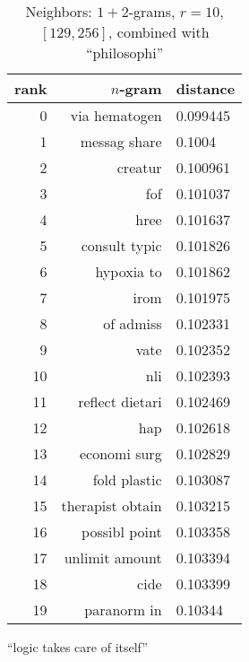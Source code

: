 \begin{table}[t]
\begin{subtable}[t]{.45\textwidth}
\begin{tabularx}{\textwidth}{r R l}
            \toprule
            rank & $n$-gram & distance\\
            \midrule
            \num{0} & via hematogen & \num{0.099445}\\
            \num{1} & messag share & \num{0.1004}\\
            \num{2} & creatur & \num{0.100961}\\
            \num{3} & fof & \num{0.101037}\\
            \num{4} & hree & \num{0.101637}\\
            \num{5} & consult typic & \num{0.101826}\\
            \midrule
            \num{6} & hypoxia to & \num{0.101862}\\
            \num{7} & irom & \num{0.101975}\\
            \num{8} & of admiss & \num{0.102331}\\
            \num{9} & vate & \num{0.102352}\\
            \num{10} & nli & \num{0.102393}\\
            \num{11} & reflect dietari & \num{0.102469}\\
            \num{12} & hap & \num{0.102618}\\
            \num{13} & economi surg & \num{0.102829}\\
            \num{14} & fold plastic & \num{0.103087}\\
            \num{15} & therapist obtain & \num{0.103215}\\
            \num{16} & possibl point & \num{0.103358}\\
            \num{17} & unlimit amount & \num{0.103394}\\
            \num{18} & cide & \num{0.103399}\\
            \num{19} & paranorm in & \num{0.10344}\\
            \bottomrule
        \end{tabularx}
        \caption{\enquote{logic takes care of itself}}\label{tab:ranking_chance2_2}
    \end{subtable}
    \caption[Neighbors under distance combination]{Neighbors: $1+2$-grams, $r = 10$, $[129,256]$, combined with \enquote{philosophi}}\label{tab:ranking_chance2}
\end{table}

